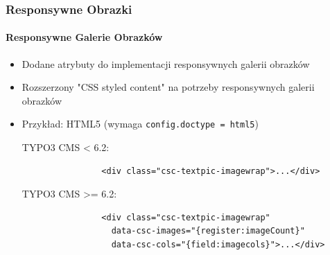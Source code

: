 \begin{frame}[fragile]
	\frametitle{Responsywne Obrazki}
	\framesubtitle{Responsywne Galerie Obrazków}

	\begin{itemize}
		\item Dodane atrybuty do implementacji responsywnych galerii obrazków
		\item Rozszerzony "CSS styled content" na potrzeby responsywnych galerii obrazków
		\item Przykład: HTML5 (wymaga \texttt{config.doctype = html5})\newline

			TYPO3 CMS < 6.2:


			\begin{lstlisting}
				<div class="csc-textpic-imagewrap">...</div>
			\end{lstlisting}

			TYPO3 CMS >= 6.2:

			\begin{lstlisting}
				<div class="csc-textpic-imagewrap"
				  data-csc-images="{register:imageCount}"
				  data-csc-cols="{field:imagecols}">...</div>
			\end{lstlisting}

	\end{itemize}

\end{frame}


